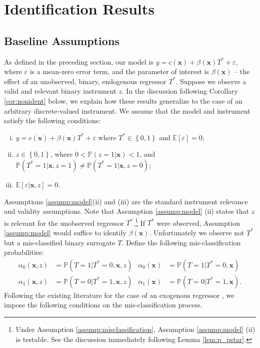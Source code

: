 \section{Identification Results}
\label{sec:identification}

\subsection{Baseline Assumptions}
\label{sec:baseline}
As defined in the preceding section, our model is $y = c(\mathbf{x}) + \beta(\mathbf{x}) T^* + \varepsilon$, where $\varepsilon$ is a mean-zero error term, and the parameter of interest is $\beta(\mathbf{x})$ -- the effect of an unobserved, binary, endogenous regressor $T^*$.
Suppose we observe a valid and relevant binary instrument $z$.
In the discussion following Corollary \ref{cor:nonident} below, we explain how these results generalize to the case of an arbitrary discrete-valued instrument.
We assume that the model and instrument satisfy the following conditions:
\begin{assump} \mbox{}
  \label{assump:model}
  \begin{enumerate}[(i)] 
    \item $y = c(\mathbf{x}) + \beta(\mathbf{x})T^* + \varepsilon$ where $T^* \in \left\{ 0,1 \right\}$ and $\mathbb{E}[\varepsilon]=0$;
    \item  $z \in \left\{ 0,1 \right\}$, where $0 < \mathbb{P}(z=1|\mathbf{x}) < 1$, and $\mathbb{P}(T^*=1|\mathbf{x},z=1) \neq \mathbb{P}(T^*=1|\mathbf{x},z=0)$;
    \item $\mathbb{E}[\varepsilon|\mathbf{x},z] = 0$.
  \end{enumerate}
\end{assump}

Assumptions \ref{assump:model}(ii) and (iii) are the standard instrument relevance and validity assumptions. 
Note that Assumption \ref{assump:model} (ii) states that $z$ is relevant for the unobserved regressor $T^*$.\footnote{Under Assumption \ref{assump:misclassification}, Assumption \ref{assump:model} (ii) is testable. See the discussion immediately following Lemma \ref{lem:p_pstar}.}
If $T^*$ were observed, Assumption \ref{assump:model} would suffice to identify  $\beta(\mathbf{x})$.  
Unfortunately we observe not $T^*$ but a mis-classified binary surrogate $T$.  
Define the following mis-classification probabilities:
\begin{align*}
  \alpha_0(\mathbf{x},z) &= \mathbb{P}\left(T=1|T^*=0,\mathbf{x},z  \right) &
  \alpha_0(\mathbf{x}) &= \mathbb{P}\left(T=1|T^*=0,\mathbf{x}  \right)\\ 
  \alpha_1(\mathbf{x},z) &= \mathbb{P}\left(T=0|T^*=1,\mathbf{x},z  \right) &
  \alpha_1(\mathbf{x}) &= \mathbb{P}\left(T=0|T^*=1,\mathbf{x}  \right).
\end{align*}
Following the existing literature for the case of an exogenous regressor \citep{Mahajan,BBS,FL,KRS,Lewbel}, we impose the following conditions on the mis-classification process.

